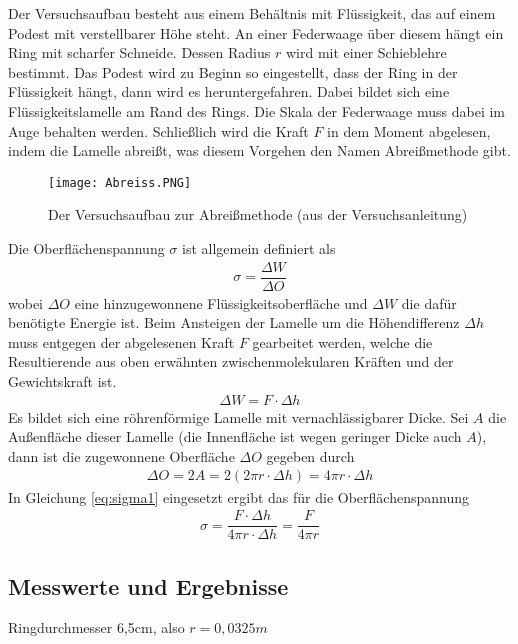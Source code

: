 \documentclass{scrartcl}
\begin{document}
Der Versuchsaufbau besteht aus einem Behältnis mit Flüssigkeit, das auf einem Podest mit verstellbarer Höhe steht. An einer Federwaage über diesem hängt ein Ring mit scharfer Schneide. Dessen Radius $r$ wird mit einer Schieblehre bestimmt. Das Podest wird zu Beginn so eingestellt, dass der Ring in der Flüssigkeit hängt, dann wird es heruntergefahren. Dabei bildet sich eine Flüssigkeitslamelle am Rand des Rings. Die Skala der Federwaage muss dabei im Auge behalten werden. Schließlich wird die Kraft $F$ in dem Moment abgelesen, indem die Lamelle abreißt, was diesem Vorgehen den Namen Abreißmethode gibt.

\begin{figure}[H]
  \centering
    \texttt{[image: Abreiss.PNG]}
  \caption{Der Versuchsaufbau zur Abreißmethode (aus der Versuchsanleitung)}
  \label{fig:Abreiss}
\end{figure}

Die Oberflächenspannung $\sigma$ ist allgemein definiert als
\begin{align}
\sigma = \dfrac{\Delta W}{\Delta O}
\label{eq:sigma1}
\end{align}
wobei $\Delta O$ eine hinzugewonnene Flüssigkeitsoberfläche und $\Delta W$ die dafür benötigte Energie ist.
Beim Ansteigen der Lamelle um die Höhendifferenz $\Delta h$ muss entgegen der abgelesenen Kraft $F$ gearbeitet werden, welche die Resultierende aus oben erwähnten zwischenmolekularen Kräften und der Gewichtskraft ist.
\begin{align}
\Delta W = F \cdot \Delta h
\end{align}
Es bildet sich eine röhrenförmige Lamelle mit vernachlässigbarer Dicke. Sei $A$ die Außenfläche dieser Lamelle (die Innenfläche ist wegen geringer Dicke auch $A$), dann ist die zugewonnene Oberfläche $\Delta O$ gegeben durch
\begin{align}
\Delta O = 2A = 2(2 \pi r \cdot \Delta h) = 4 \pi r \cdot \Delta h
\label{eq:delta_O}
\end{align}
In Gleichung \ref{eq:sigma1} eingesetzt ergibt das für die Oberflächenspannung
\begin{align}
\sigma = \dfrac{F \cdot \Delta h}{4 \pi r \cdot \Delta h} = \dfrac{F}{4 \pi r} \label{eq:sigma2}
\end{align}
\subsection{Messwerte und Ergebnisse}
Ringdurchmesser 6,5cm, also $r = 0,0325m$
\end{document}
